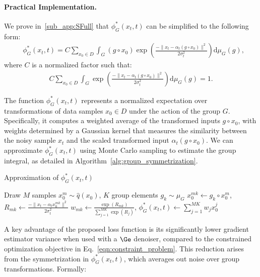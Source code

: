 \paragraph{Practical Implementation.}  
We prove in~\cref{sub_app:SFull} that \(\phi^*_G(x_t, t)\) can be simplified to the following form:
\begin{align*}
    &\phi^*_G(x_t, t) = C \sum_{x_0 \in D} \int_G (g \circ x_0) \exp \left( \frac{-\|x_t - \alpha_t(g \circ x_0)\|^2}{2 \sigma_t^2} \right) \mathrm{d}\mu_G(g), 
    \label{eqn:final_form}
\end{align*}
where \(C\) is a normalized factor such that:
\begin{align*}
    C \sum_{x_0 \in D} \int_G \exp \left( \frac{-\|x_t - \alpha_t(g \circ x_0)\|^2}{2 \sigma_t^2} \right) \mathrm{d}\mu_G(g) = 1.
\end{align*}
    

The function \(\phi^*_G(x_t, t)\) represents a normalized expectation over transformations of data samples \(x_0 \in D\) under the action of the group \(G\). Specifically, it computes a weighted average of the transformed inputs \(g \circ x_0\), with weights determined by a Gaussian kernel that measures the similarity between the noisy sample \(x_t\) and the scaled transformed input \(\alpha_t (g \circ x_0)\). We can approximate \(\phi^*_G(x_t, t)\) using Monte Carlo sampling to estimate the group integral, as detailed in Algorithm~\ref{alg:group_symmetrization}. 

\begin{algorithm}[H]
    \caption{Approximation of \( \phi^*_G(x_t, t) \)}
    \label{alg:group_symmetrization}
    \begin{algorithmic}[1]
        \STATE Draw \( M \) samples \( x_0^m \sim \hat{q}(x_0) \), \( K \) group elements \( g_k \sim \mu_G \)
            \STATE \( x_0^{mk} \leftarrow g_k \circ x_0^m \), \quad 
            \( R_{mk} \leftarrow \frac{-\| x_t - \alpha_t x_0^{mk} \|^2}{2\sigma_t^2} \)
        \ENDFOR
        \STATE \( w_{mk} \leftarrow \frac{\exp(R_{mk})}{\sum_{j=1}^{MK} \exp(R_j)} \), \quad
        \( \phi^*_G(x_t, t) \leftarrow \sum_{j=1}^{MK} w_j x_0^j \)
    \end{algorithmic}
\end{algorithm}

A key advantage of the proposed loss function is its significantly lower gradient estimator variance when used with a \(\Ge\) denoiser, compared to the constrained optimization objective in Eq.~\eqref{eqn:constraint_problem}. This reduction arises from the symmetrization in \(\phi^*_G(x_t, t)\), which averages out noise over group transformations. Formally:

